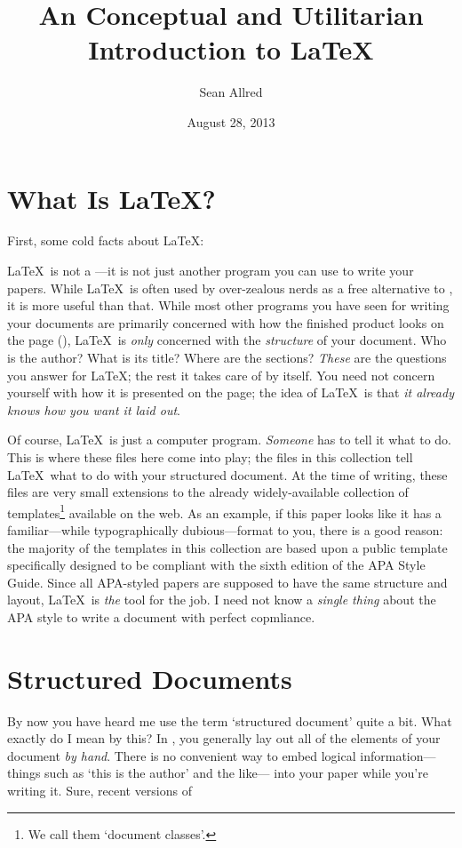 \documentclass{psypaper}
\title{An Conceptual and Utilitarian Introduction to \LaTeX}
\author{Sean Allred}
\date{August 28, 2013}
\begin{document}
\maketitle

\section{What Is \LaTeX?}
First, some cold facts about \LaTeX:

\LaTeX\ is not a \wysiwyg---it is not just another program you can use to write your papers.
While \LaTeX\ is often used by over-zealous nerds as a free alternative to \MicrosoftWord,
  it is more useful than that.
While most other programs you have seen for writing your documents
  are primarily concerned with how the finished product looks on the page (\wysiwyg),
  \LaTeX\ is \emph{only} concerned with the \emph{structure} of your document.
Who is the author?
What is its title?
Where are the sections?
\emph{These} are the questions you answer for \LaTeX;
  the rest it takes care of by itself.
You need not concern yourself with how it is presented on the page;
  the idea of \LaTeX\ is that \emph{it already knows how you want it laid out}.

Of course, \LaTeX\ is just a computer program.
\emph{Someone} has to tell it what to do.
This is where these files here come into play;
  the files in this collection tell \LaTeX\ what to do
  with your structured document.
At the time of writing, these files are very small extensions
  to the already widely-available collection of templates\footnote{We call them `document classes'.}
  available on the web.
As an example, if this paper looks like it has
  a familiar---while typographically dubious---format to you,
  there is a good reason: the majority of the templates in this collection
  are based upon a public template specifically designed
  to be compliant with the sixth edition of the APA Style Guide.
Since all APA-styled papers are supposed to have the same structure and layout,
  \LaTeX\ is \emph{the} tool for the job.
I need not know a \emph{single thing} about the APA style
  to write a document with perfect copmliance.

\section{Structured Documents}
By now you have heard me use the term `structured document' quite a bit.
What exactly do I mean by this?
In \MicrosoftWord, you generally lay out all of the elements of your document \emph{by hand}.
There is no convenient way to embed logical information---%
  things such as `this is the author' and the like---%
  into your paper while you're writing it.
Sure, recent versions of 
\end{document}
